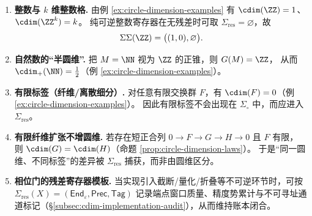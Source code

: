 \begin{example}
\label{ex:cdim-signature}
\begin{enumerate}
  \item \textbf{整数与 \(k\) 维整数格.}
        由例 \ref{ex:circle-dimension-examples} 有 \(\cdim(\ZZ)=1\)、\(\cdim(\ZZ^k)=k\)。
        纯可逆整数寄存器在无残差时可取 \(\Sigma_{\mathrm{res}}=\varnothing\)，故
        \[
        \Sigma\Sigma(\ZZ)=\bigl((1,0),\varnothing\bigr).
        \]
  \item \textbf{自然数的“半圆维”.}
        把 \(M=\NN\) 视为 \(\ZZ\) 的正锥，则 \(G(M)=\ZZ\)，
        从而 \(\cdim_{+}(\NN)=\tfrac12\)（例 \ref{ex:circle-dimension-examples}）。
  \item \textbf{有限标签（纤维/离散细分）.}
        对任意有限交换群 \(F\)，有 \(\cdim(F)=0\)（例 \ref{ex:circle-dimension-examples}）。
        因此有限标签不会出现在 \(\Sigma_{\circ}\) 中，而应进入 \(\Sigma_{\mathrm{res}}\)。
  \item \textbf{有限纤维扩张不增圆维.}
        若存在短正合列 \(0\to F\to G\to H\to 0\) 且 \(F\) 有限，
        则 \(\cdim(G)=\cdim(H)\)（命题 \ref{prop:circle-dimension-laws}）。
        于是“同一圆维、不同标签”的差异被 \(\Sigma_{\mathrm{res}}\) 捕获，而非由圆维区分。
  \item \textbf{相位门的残差寄存器模板.}
        当实现引入截断/量化/折叠等不可逆环节时，可按
        \(
        \Sigma_{\mathrm{res}}(X)=(\mathsf{End}_\varepsilon,\mathsf{Prec},\mathsf{Tag})
        \)
        记录端点窗口质量、精度势累计与不可寻址通道标记（\S\ref{subsec:cdim-implementation-audit}），从而维持账本闭合。
\end{enumerate}
\end{example}




